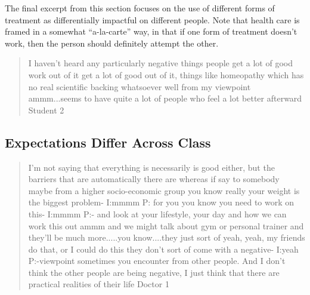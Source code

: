 The final excerpt from this section focuses on the use of different forms of treatment as differentially impactful on different people. Note that health care is framed in a somewhat ``a-la-carte'' way, in that if one form of treatment doesn't work, then the person should definitely attempt the other. 

  

\begin{quotation}
  I haven't heard any particularly negative things people get a lot of good work out of it get a lot of good out of it, things like homeopathy which has no real scientific backing whatsoever well from my viewpoint ammm...seems to have quite a lot of people who feel a lot better afterward
Student 2
\end{quotation}

\subsection{Expectations Differ Across Class}
\label{sec:expect-diff-across}

\begin{quotation}
 I'm not saying that everything is necessarily is good either, but the barriers that are automatically there are whereas if say to somebody maybe from a higher socio-economic group you know really your weight is the biggest problem-
I:mmmm
P: for you you know you need to work on this-
I:mmmm
P:- and look at your lifestyle, your day and how we can work this out ammm and we might talk about gym or personal trainer and they'll be much more.....you know....they just sort of yeah, yeah, my friends do that, or I could do this they don't sort of come with a negative-
I:yeah
P:-viewpoint sometimes you encounter from other people. And I don't think the other people are being negative, I just think that there are practical realities of their life
  Doctor 1
\end{quotation}

